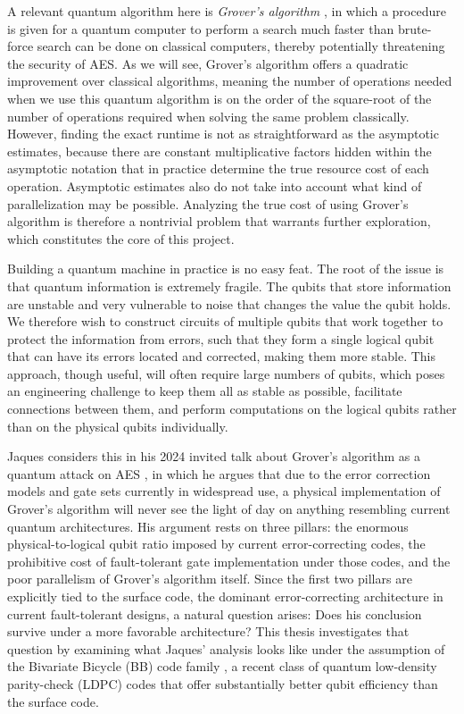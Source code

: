 A relevant quantum algorithm here is \emph{Grover's algorithm} \cite{Nielsen_Chuang_2010}, in which a procedure is given for a quantum computer to perform a search much faster than brute-force search can be done on classical computers, thereby potentially threatening the security of AES. As we will see, Grover's algorithm offers a quadratic improvement over classical algorithms, meaning the number of operations needed when we use this quantum algorithm is on the order of the square-root of the number of operations required when solving the same problem classically. However, finding the exact runtime is not as straightforward as the asymptotic estimates, because there are constant multiplicative factors hidden within the asymptotic notation that in practice determine the true resource cost of each operation. Asymptotic estimates also do not take into account what kind of parallelization may be possible. Analyzing the true cost of using Grover's algorithm is therefore a nontrivial problem that warrants further exploration, which constitutes the core of this project.

Building a quantum machine in practice is no easy feat. The root of the issue is that quantum information is extremely fragile. The qubits that store information are unstable and very vulnerable to noise that changes the value the qubit holds. We therefore wish to construct circuits of multiple qubits that work together to protect the information from errors, such that they form a single logical qubit that can have its errors located and corrected, making them more stable. This approach, though useful, will often require large numbers of qubits, which poses an engineering challenge to keep them all as stable as possible, facilitate connections between them, and perform computations on the logical qubits rather than on the physical qubits individually.

Jaques considers this in his 2024 invited talk about Grover's algorithm as a quantum attack on AES \cite{jaques2024ches_presentation}, in which he argues that due to the error correction models and gate sets currently in widespread use, a physical implementation of Grover's algorithm will never see the light of day on anything resembling current quantum architectures. His argument rests on three pillars: the enormous physical-to-logical qubit ratio imposed by current error-correcting codes, the prohibitive cost of fault-tolerant gate implementation under those codes, and the poor parallelism of Grover's algorithm itself. Since the first two pillars are explicitly tied to the surface code, the dominant error-correcting architecture in current fault-tolerant designs, a natural question arises: Does his conclusion survive under a more favorable architecture? This thesis investigates that question by examining what Jaques' analysis looks like under the assumption of the Bivariate Bicycle (BB) code family \cite{Bravyi2024}, a recent class of quantum low-density parity-check (LDPC) codes that offer substantially better qubit efficiency than the surface code.

